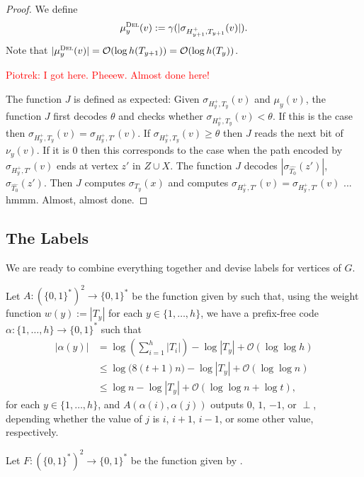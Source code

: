 \documentclass[kpfonts]{patmorin}
\newcommand{\Oh}{\mathcal{O}}
\let\leq\leqslant
\let\geq\geqslant
\begin{document}
\begin{proof}
We define 
  \[\mu_y^{\textsc{Del}}(v) := \gamma(|\sigma_{H^{+}_{y+1},T_{y+1}}(v)|).
  \]
Note that $|\mu_y^{\textsc{Del}}(v)| = \Oh(\log h(T_{y+1})) = \Oh(\log h(T_y))$.

\textcolor{red}{Piotrek: I got here. Pheeew. Almost done here!}


  The function $J$ is defined as expected:
  Given $\sigma_{H^+_y,T_{y}}(v)$ and $\mu_y(v)$, 
  the function $J$ first decodes $\theta$ and checks whether $\sigma_{H^+_y,T_{y}}(v) < \theta$. 
  If this is the case then $\sigma_{H^+_y,T_{y}}(v) = \sigma_{H^+_y,T'}(v)$.
  If $\sigma_{H^+_y,T_{y}}(v) \geq \theta$ then $J$ reads the next bit of $\nu_y(v)$. 
  If it is $0$ then this corresponds to the case when the path encoded by $\sigma_{H^+_y,T'}(v)$ ends at vertex $z'$ in $Z\cup X$. 
  The function $J$ decodes $|\sigma_{\hat{T_0}}(z')|$, $\sigma_{\hat{T_0}}(z')$.
  Then $J$ computes $\sigma_{T_y}(x)$ and computes $\sigma_{H^+_y,T'}(v)=\sigma_{H^+_y,T'}(v)$ ...
  hmmm. Almost, almost done.
\end{proof}

\subsection{The Labels}

We are ready to combine everything together and devise labels for vertices of $G$.

Let $A:(\{0,1\}^{*})^2\to\{0,1\}^*$ be the function given by  such that, 
using the weight function $w(y):=|T_y|$ for each $y\in\{1,\ldots,h\}$,
we have a prefix-free code $\alpha:\{1,\ldots,h\}\to\{0,1\}^*$ such that
\begin{align*}
|\alpha(y)|&=\log\left(\textstyle\sum_{i=1}^h|T_i|\right) - \log|T_y| + \Oh(\log\log h)\\
&\leq \log\bigl( 8(t+1)n\bigr) - \log|T_y| + \Oh(\log\log n)\\
&\leq \log n -\log|T_y| + \Oh(\log\log n + \log t),
\end{align*}
for each $y\in\{1,\ldots,h\}$, and $A(\alpha(i),\alpha(j))$ outputs $0$, $1$, $-1$, or $\perp$, depending whether the value of $j$ is $i$, $i+1$, $i-1$, or some other value, respectively.


Let $F:(\{0,1\}^{*})^2\to\{0,1\}^*$ be the function given by .
\end{document}
